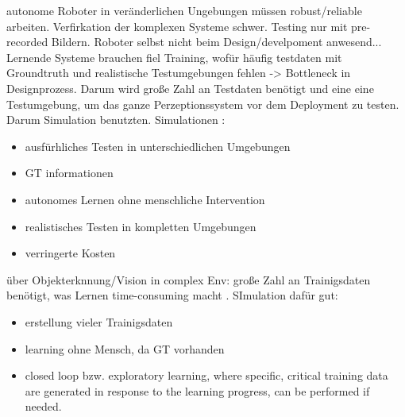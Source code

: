 \cite{burger1995} \newline
autonome Roboter in veränderlichen Ungebungen müssen robust/reliable arbeiten. Verfirkation der komplexen Systeme schwer. Testing nur mit pre-recorded Bildern. Roboter selbst nicht beim Design/develpoment anwesend... Lernende Systeme brauchen fiel Training, wofür häufig testdaten mit Groundtruth und realistische Testumgebungen fehlen -> Bottleneck in Designprozess. \newline
Darum wird große Zahl an Testdaten benötigt und eine eine Testumgebung, um das ganze Perzeptionssystem vor dem Deployment zu testen. Darum Simulation benutzten. \newline
Simulationen :
\begin{itemize}
	\item ausfürhliches Testen in unterschiedlichen Umgebungen
	\item GT informationen
	\item autonomes Lernen ohne menschliche Intervention
	\item realistisches Testen in kompletten Umgebungen
	\item verringerte Kosten 
\end{itemize}
über Objekterknnung/Vision in complex Env: große Zahl an Trainigsdaten benötigt, was Lernen time-consuming macht . SImulation dafür gut:
\begin{itemize}
	\item erstellung vieler Trainigsdaten
	\item learning ohne Mensch, da GT vorhanden
	\item closed loop bzw. exploratory learning, where specific, critical training data are generated in response to the learning progress, can be performed if needed.
\end{itemize}

